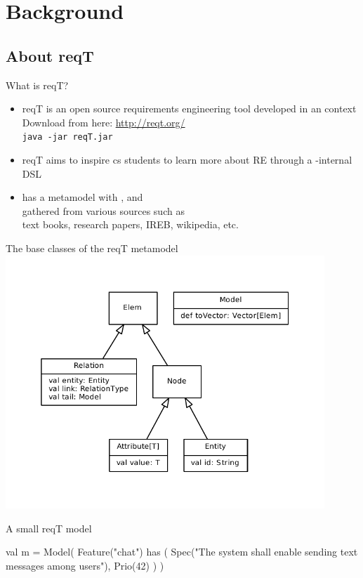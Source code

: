 \documentclass{slides}
\begin{document}
\section{Background}
\subsection{About reqT}
\begin{Slide}{What is reqT?}
\begin{itemize}
\item reqT is an open source requirements engineering tool developed in an  context\\ Download from here: \url{http://reqt.org/} \\ \texttt{java -jar reqT.jar}
\item reqT aims to inspire  cs students to learn more about RE through a -internal DSL
\item has a metamodel with {\color{entityColor}{\bf entities}}, {\color{relationColor}{\bf relations}} and {\color{attributeColor}{\bf attributes}}\\ gathered from various sources such as \\ text books, research papers, IREB, wikipedia, etc.
\end{itemize}
\end{Slide}

\begin{Slide}{The base classes of the reqT metamodel}
\includegraphics[width=0.9\textwidth]{img/metamodel}
\end{Slide}

\begin{Slide}{A small reqT model}
\begin{Code}
val m = Model(
  Feature("chat") has (
    Spec("The system shall enable sending text messages among users"),
    Prio(42)
  )
)
\end{Code}
\end{Slide}
\end{document}
